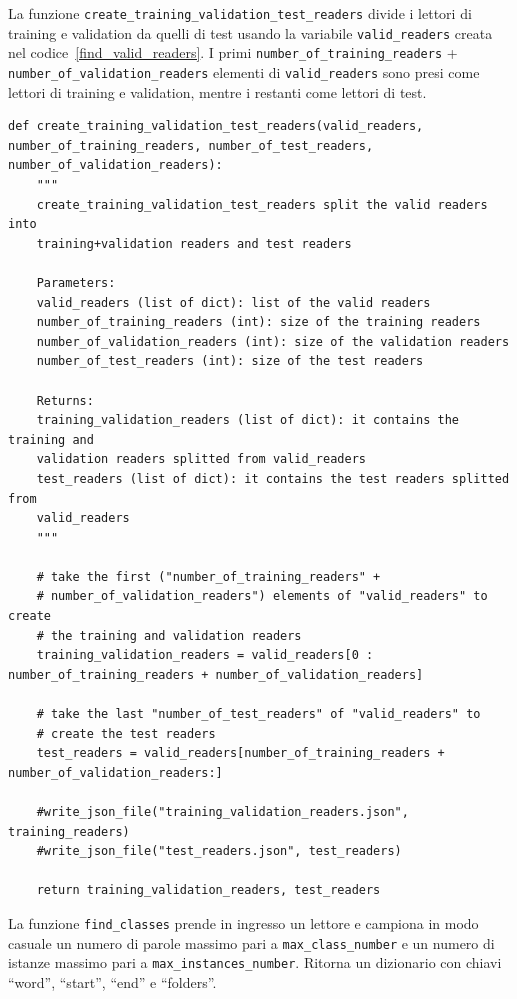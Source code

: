 \documentclass[12pt,a4paper,titlepage]{article}
\begin{document}
La funzione \texttt{create\_training\_validation\_test\_readers} divide i lettori di training e validation da quelli di test usando la variabile \texttt{valid\_readers} creata nel codice~\ref{find_valid_readers}. I primi \texttt{number\_of\_training\_readers} + \texttt{number\_of\_validation\_readers} elementi di \texttt{valid\_readers} sono presi come lettori di training e validation, mentre i restanti come lettori di test.

\begin{lstlisting}[language=iPython,firstnumber=72, caption=Funzione \texttt{create\_training\_validation\_test\_readers}, label=create_training_validation_test_readers,captionpos=b]
def create_training_validation_test_readers(valid_readers, number_of_training_readers, number_of_test_readers, number_of_validation_readers):
    """
    create_training_validation_test_readers split the valid readers into
    training+validation readers and test readers

    Parameters:
    valid_readers (list of dict): list of the valid readers
    number_of_training_readers (int): size of the training readers
    number_of_validation_readers (int): size of the validation readers
    number_of_test_readers (int): size of the test readers

    Returns:
    training_validation_readers (list of dict): it contains the training and
    validation readers splitted from valid_readers
    test_readers (list of dict): it contains the test readers splitted from 
    valid_readers
    """

    # take the first ("number_of_training_readers" + 
    # number_of_validation_readers") elements of "valid_readers" to create
    # the training and validation readers
    training_validation_readers = valid_readers[0 : number_of_training_readers + number_of_validation_readers]

    # take the last "number_of_test_readers" of "valid_readers" to
    # create the test readers
    test_readers = valid_readers[number_of_training_readers + number_of_validation_readers:]

    #write_json_file("training_validation_readers.json", training_readers)
    #write_json_file("test_readers.json", test_readers)

    return training_validation_readers, test_readers
\end{lstlisting}

La funzione \texttt{find\_classes} prende in ingresso un lettore e campiona in modo casuale un numero di parole massimo pari a \texttt{max\_class\_number} e un numero di istanze massimo pari a \texttt{max\_instances\_number}. Ritorna un dizionario con chiavi ``word'', ``start'', ``end'' e ``folders''.
\end{document}
